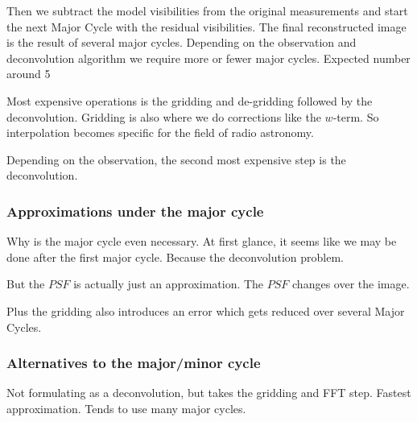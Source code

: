Then we subtract the model visibilities from the original measurements and start the next Major Cycle with the residual visibilities. The final reconstructed image is the result of several major cycles. Depending on the observation and deconvolution algorithm we require more or fewer major cycles. Expected number around 5

Most expensive operations is the gridding and de-gridding followed by the deconvolution. Gridding is also where we do corrections like the $w$-term. So interpolation becomes specific for the field of radio astronomy.

Depending on the observation, the second most expensive step is the deconvolution.


\subsubsection{Approximations under the major cycle} \label{intro:major:approximations}
Why is the major cycle even necessary. At first glance, it seems like we may be done after the first major cycle. Because the deconvolution problem.

But the $PSF$ is actually just an approximation. The $PSF$ changes over the image.

Plus the gridding also introduces an error which gets reduced over several Major Cycles.

\subsubsection{Alternatives to the major/minor cycle}
Not formulating as a deconvolution, but takes the gridding and FFT step. Fastest approximation. Tends to use many major cycles.
